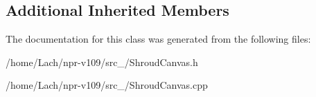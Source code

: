 \subsection*{Additional Inherited Members}


The documentation for this class was generated from the following files\+:\begin{DoxyCompactItemize}
\item 
/home/\+Lach/npr-\/v109/src\+\_/Shroud\+Canvas.\+h\item 
/home/\+Lach/npr-\/v109/src\+\_/Shroud\+Canvas.\+cpp\end{DoxyCompactItemize}
